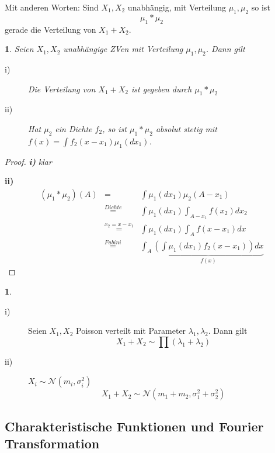 \documentclass[10pt,a4paper]{report}
\numberwithin{equation}{section}
\numberwithin{figure}{section}
\theoremstyle{plain}
\theoremstyle{definition}
\newtheorem{example}[thm]{\protect\examplename}
\theoremstyle{remark}
\theoremstyle{plain}
\newtheorem{prop}[thm]{\protect\propositionname}
\providecommand{\examplename}{Beispiel}
\providecommand{\propositionname}{Satz}
\newcommand{\1}{ \mathbb{1} } %
\begin{document}
Mit anderen Worten: Sind $X_{1},X_{2}$ unabhängig, mit Verteilung
$\mu_{1},\mu_{2}$ so ist 
\[
\mu_{1}*\mu_{2}
\]
gerade die Verteilung von $X_{1}+X_{2}$\@.
\begin{prop}
Seien $X_{1},X_{2}$ unabhängige ZVen mit Verteilung $\mu_{1},\mu_{2}$.
Dann gilt
\begin{description}
\item [{i)}] Die Verteilung von $X_{1}+X_{2}$ ist gegeben durch $\mu_{1}*\mu_{2}$
\item [{ii)}] Hat $\mu_{2}$ ein Dichte $f_{2}$, so ist $\mu_{1}*\mu_{2}$
absolut stetig mit $f\left(x\right)=\int f_{2}\left(x-x_{1}\right)\mu_{1}\left(dx_{1}\right)$. 
\end{description}
\end{prop}
\begin{proof}
\textbf{\textit{i)}}\textit{ klar}

\textbf{ii)} 
\begin{eqnarray*}
\left(\mu_{1}*\mu_{2}\right)\left(A\right) & = & \int\mu_{1}\left(dx_{1}\right)\mu_{2}\left(A-x_{1}\right)\\
 & \overset{Dichte}{=} & \int\mu_{1}\left(dx_{1}\right)\int_{A-x_{1}}f\left(x_{2}\right)dx_{2}\\
 & \overset{x_{2}=x-x_{1}}{=} & \int\mu_{1}\left(dx_{1}\right)\int_{A}f\left(x-x_{1}\right)dx\\
 & \overset{Fubini}{=} & \int_{A}\underset{f\left(x\right)}{\underbrace{\left(\int\mu_{1}\left(dx_{1}\right)f_{2}\left(x-x_{1}\right)\right)dx}}
\end{eqnarray*}
\end{proof}
\begin{example}
 \ 
\begin{description}
\item [{i)}] Seien $X_{1},X_{2}$ Poisson verteilt mit Parameter $\lambda_{1},\lambda_{2}$.
Dann gilt
\[
X_{1}+X_{2}\sim\prod\left(\lambda_{1}+\lambda_{2}\right)
\]

\item [{ii)}] $X_{i}\sim\mathcal{N}\left(m_{i},\sigma_{i}^{2}\right)$
\[
X_{1}+X_{2}\sim\mathcal{N}\left(m_{1}+m_{2},\sigma_{1}^{2}+\sigma_{2}^{2}\right)
\]
 
\end{description}
\end{example}


\subsection*{Charakteristische Funktionen und Fourier Transformation}
\end{document}
